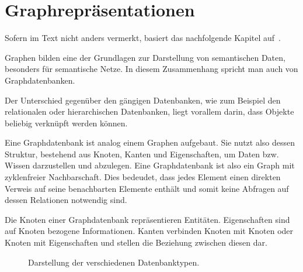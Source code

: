 \chapter{Graphrepräsentationen}
\label{chap:graph_data}

Sofern im Text nicht anders vermerkt, basiert das nachfolgende Kapitel auf~\cite{linkeddatatools}.

Graphen bilden eine der Grundlagen zur Darstellung von semantischen Daten, besonders für semantische Netze. In diesem Zusammenhang spricht man auch von Graphdatenbanken.

Der Unterschied gegenüber den gängigen Datenbanken, wie zum Beispiel den relationalen oder hierarchischen Datenbanken, liegt vorallem darin, dass Objekte beliebig verknüpft werden können.

Eine Graphdatenbank ist analog einem Graphen aufgebaut. Sie nutzt also dessen Struktur, bestehend aus Knoten, Kanten und Eigenschaften, um Daten bzw. Wissen darzustellen und abzulegen. Eine Graphdatenbank ist also ein Graph mit zyklenfreier Nachbarschaft. Dies bedeudet, dass jedes Element einen direkten Verweis auf seine benachbarten Elemente enthält und somit keine Abfragen auf dessen Relationen notwendig sind.

Die Knoten einer Graphdatenbank repräsentieren Entitäten. Eigenschaften sind auf Knoten bezogene Informationen. Kanten verbinden Knoten mit Knoten oder Knoten mit Eigenschaften und stellen die Beziehung zwischen diesen dar.

\begin{figure}[htbp]
\centering {}
\caption{Darstellung der verschiedenen Datenbanktypen.\label{fig:datenbanktypen}\protect\footnotemark}
\end{figure}

